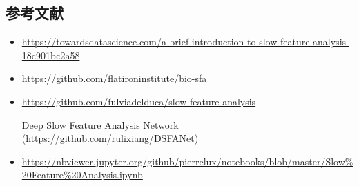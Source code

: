 \subsection{参考文献}
\begin{itemize}
\item \url{https://towardsdatascience.com/a-brief-introduction-to-slow-feature-analysis-18c901bc2a58}
\item \url{https://github.com/flatironinstitute/bio-sfa}
\item \url{https://github.com/fulviadelduca/slow-feature-analysis}
\item [Deep Slow Feature Analysis Network](https://github.com/rulixiang/DSFANet)
\item \url{https://nbviewer.jupyter.org/github/pierrelux/notebooks/blob/master/Slow%20Feature%20Analysis.ipynb}
\end{itemize}
